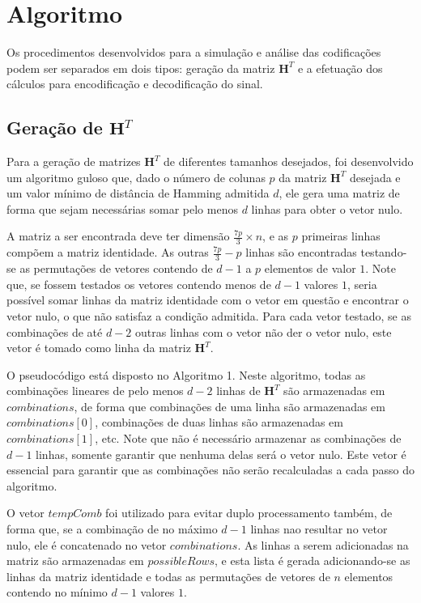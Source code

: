 \section{Algoritmo}

Os procedimentos desenvolvidos para a simulação e análise das codificações podem ser separados em dois tipos: geração da matriz $\textbf{H}^T$ e a efetuação dos cálculos para encodificação e decodificação do sinal.

\subsection{Geração de $\textbf{H}^T$}
Para a geração de matrizes $\textbf{H}^T$ de diferentes tamanhos desejados, foi desenvolvido um algoritmo guloso que, dado o número de colunas $p$ da matriz $\textbf{H}^T$ desejada e um valor mínimo de distância de Hamming admitida $d$, ele gera uma matriz de forma que sejam necessárias somar pelo menos $d$ linhas para obter o vetor nulo. 

A matriz a ser encontrada deve ter dimensão $\frac{7p}{3} \times n$, e as $p$ primeiras linhas compõem a matriz identidade. As outras $\frac{7p}{3} - p$ linhas são encontradas testando-se as permutações de vetores contendo de $d - 1$ a $p$ elementos de valor $1$. Note que, se fossem testados os vetores contendo menos de $d - 1$ valores $1$, seria possível somar linhas da matriz identidade com o vetor em questão e encontrar o vetor nulo, o que não satisfaz a condição admitida. Para cada vetor testado, se as combinações de até $d - 2$ outras linhas com o vetor não der o vetor nulo, este vetor é tomado como linha da matriz $\textbf{H}^T$.

O pseudocódigo está disposto no Algoritmo 1. Neste algoritmo, todas as combinações lineares de pelo menos $d - 2$ linhas de $\textbf{H}^T$ são armazenadas em $combinations$, de forma que combinações de uma linha são armazenadas em $combinations[0]$, combinações de duas linhas são armazenadas em $combinations[1]$, etc. Note que não é necessário armazenar as combinações de $d - 1$ linhas, somente garantir que nenhuma delas será o vetor nulo. Este vetor é essencial para garantir que as combinações não serão recalculadas a cada passo do algoritmo.

O vetor $tempComb$ foi utilizado para evitar duplo processamento também, de forma que, se a combinação de no máximo $d - 1$ linhas nao resultar no vetor nulo, ele é concatenado no vetor $combinations$. As linhas a serem adicionadas na matriz são armazenadas em $possibleRows$, e esta lista é gerada adicionando-se as linhas da matriz identidade e todas as permutações de vetores de $n$ elementos contendo no mínimo $d - 1$ valores $1$.

